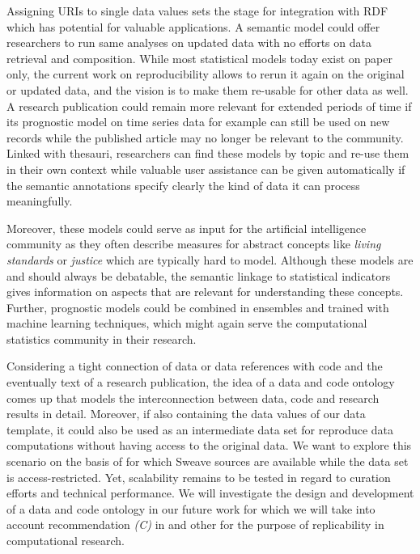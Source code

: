 \documentclass{acm_proc_article-sp}
\begin{document}
Assigning URIs to single data values sets the stage for integration with RDF which has potential for valuable applications.
A semantic model could offer researchers to run same analyses on updated data with no efforts on data retrieval and composition.
While most statistical models today exist on paper only, the current work on reproducibility allows to rerun it again on the original or updated data, and the vision is to make them re-usable for other data as well.
A research publication could remain more relevant for extended periods of time if its prognostic model on time series data for example can still be used on new records while the published article may no longer be relevant to the community.
Linked with thesauri, researchers can find these models by topic and re-use them in their own context while valuable user assistance can be given automatically if the semantic annotations specify clearly the kind of data it can process meaningfully.


Moreover, these models could serve as input for the artificial intelligence community as they often describe measures for abstract concepts like \textit{living standards} or \textit{justice} which are typically hard to model.
Although these models are and should always be debatable, the semantic linkage to statistical indicators gives information on aspects that are relevant for understanding these concepts.
Further, prognostic models could be combined in ensembles and trained with machine learning techniques, which might again serve the computational statistics community in their research.


Considering a tight connection of data or data references with code and the eventually text of a research publication, the idea of a data and code ontology comes up that models the interconnection between data, code and research results in detail. 
Moreover, if also containing the data values of our data template, it could also be used as an intermediate data set for reproduce data computations without having access to the original data.
We want to explore this scenario on the basis of \cite{arai2011fragile} for which Sweave sources are available while the data set is access-restricted.
Yet, scalability remains to be tested in regard to curation efforts and technical performance.
We will investigate the design and development of a data and code ontology in our future work for which we will take into account recommendation \textit{(C)} in \cite{RePEc_ejw_journl_v_4_y_2007_i_3_p_326_337} and other
%
%
\cite{KoenkerZeileis2009} 
%
\cite{baiocchi2007reproducible}
%
\cite{gentleman2007statistical}
%
\cite{rahmandad2012reporting}
for the purpose of replicability in computational research.
\end{document}
